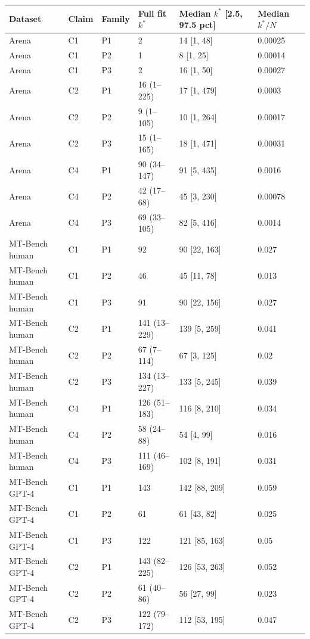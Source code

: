 {\footnotesize\setlength{\tabcolsep}{3pt}
\begin{tabular}{llllll}
\toprule
Dataset & Claim & Family & Full fit $k^*$ & Median $k^*$ [2.5, 97.5 pct] & Median $k^*/N$ \\
\midrule
Arena & C1 & P1 & 2 & 14 [1, 48] & 0.00025 \\
Arena & C1 & P2 & 1 & 8 [1, 25] & 0.00014 \\
Arena & C1 & P3 & 2 & 16 [1, 50] & 0.00027 \\
Arena & C2 & P1 & 16 (1--225) & 17 [1, 479] & 0.0003 \\
Arena & C2 & P2 & 9 (1--105) & 10 [1, 264] & 0.00017 \\
Arena & C2 & P3 & 15 (1--165) & 18 [1, 471] & 0.00031 \\
Arena & C4 & P1 & 90 (34--147) & 91 [5, 435] & 0.0016 \\
Arena & C4 & P2 & 42 (17--68) & 45 [3, 230] & 0.00078 \\
Arena & C4 & P3 & 69 (33--105) & 82 [5, 416] & 0.0014 \\
\midrule
MT-Bench human & C1 & P1 & 92 & 90 [22, 163] & 0.027 \\
MT-Bench human & C1 & P2 & 46 & 45 [11, 78] & 0.013 \\
MT-Bench human & C1 & P3 & 91 & 90 [22, 156] & 0.027 \\
MT-Bench human & C2 & P1 & 141 (13--229) & 139 [5, 259] & 0.041 \\
MT-Bench human & C2 & P2 & 67 (7--114) & 67 [3, 125] & 0.02 \\
MT-Bench human & C2 & P3 & 134 (13--227) & 133 [5, 245] & 0.039 \\
MT-Bench human & C4 & P1 & 126 (51--183) & 116 [8, 210] & 0.034 \\
MT-Bench human & C4 & P2 & 58 (24--88) & 54 [4, 99] & 0.016 \\
MT-Bench human & C4 & P3 & 111 (46--169) & 102 [8, 191] & 0.031 \\
\midrule
MT-Bench GPT-4 & C1 & P1 & 143 & 142 [88, 209] & 0.059 \\
MT-Bench GPT-4 & C1 & P2 & 61 & 61 [43, 82] & 0.025 \\
MT-Bench GPT-4 & C1 & P3 & 122 & 121 [85, 163] & 0.05 \\
MT-Bench GPT-4 & C2 & P1 & 143 (82--225) & 126 [53, 263] & 0.052 \\
MT-Bench GPT-4 & C2 & P2 & 61 (40--86) & 56 [27, 99] & 0.023 \\
MT-Bench GPT-4 & C2 & P3 & 122 (79--172) & 112 [53, 195] & 0.047 \\

\end{tabular}}

